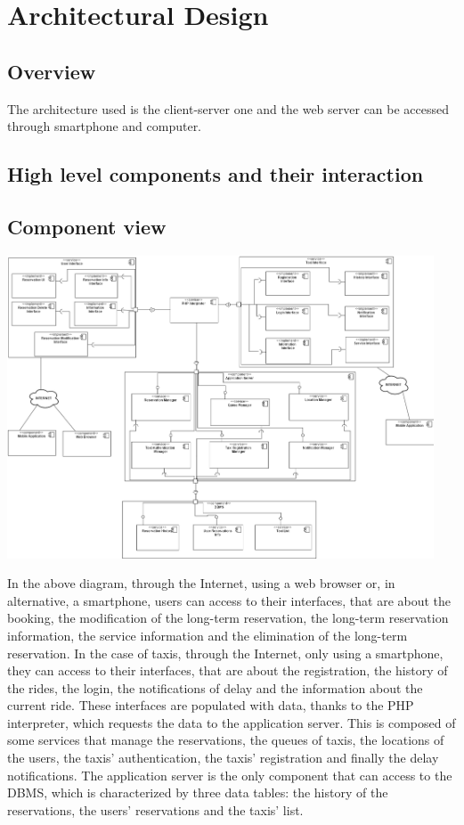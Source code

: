 \section{Architectural Design}
\subsection{Overview}
The architecture used is the client-server one and the web server can be accessed through smartphone and computer.

\subsection{High level components and their interaction}
\subsection{Component view}
	\begin{center}
		\includegraphics[width=0.95\textwidth]{./images/component_view.png}
	\end{center}
	
	In the above diagram, through the Internet, using a web browser or, in alternative, a smartphone, users can access to their interfaces, that are about the booking, the modification of the long-term reservation, the long-term reservation information, the service information and the elimination of the long-term reservation. 
	In the case of taxis, through the Internet, only using a smartphone, they can access to their interfaces, that are about the registration, the history of the rides, the login, the notifications of delay and the information about the current ride.
	These interfaces are populated with data, thanks to the PHP interpreter, which requests the data to the application server. This is composed of some services that manage the reservations, the queues of taxis, the locations of the users, the taxis' authentication, the taxis' registration and finally the delay notifications.
	The application server is the only component that can access to the DBMS, which is characterized by three data tables: the history of the reservations, the users' reservations and the taxis' list.

